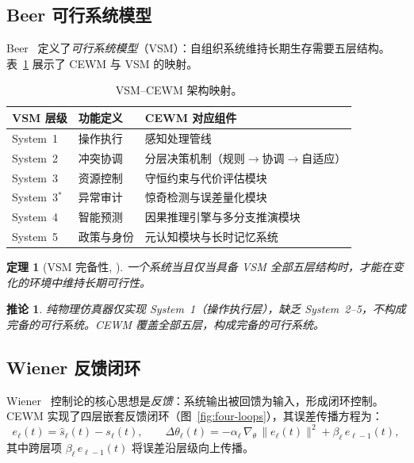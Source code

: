 \documentclass[11pt,a4paper]{article}
\newtheorem{theorem}{定理}[section]
\newtheorem{corollary}{推论}[theorem]
\newcommand{\CEWM}{\textsc{CEWM}}
\newcommand{\VSM}{\textsc{VSM}}
\begin{document}
\subsection{Beer 可行系统模型}

Beer~\citeyearpar{beer1979heart,beer1985diagnosing} 定义了\emph{可行系统模型}（\VSM{}）：自组织系统维持长期生存需要五层结构。表~\ref{tab:vsm} 展示了 \CEWM{} 与 \VSM{} 的映射。

\begin{table}[H]
\centering
\caption{\VSM{}--\CEWM{} 架构映射。}\label{tab:vsm}
\small
\begin{tabularx}{\textwidth}{llX}
\toprule
\textbf{VSM 层级} & \textbf{功能定义} & \textbf{\CEWM{} 对应组件} \\
\midrule
System~1 & 操作执行 & 感知处理管线 \\
System~2 & 冲突协调 & 分层决策机制（规则$\to$协调$\to$自适应） \\
System~3 & 资源控制 & 守恒约束与代价评估模块 \\
System~3$^*$ & 异常审计 & 惊奇检测与误差量化模块 \\
System~4 & 智能预测 & 因果推理引擎与多分支推演模块 \\
System~5 & 政策与身份 & 元认知模块与长时记忆系统 \\
\bottomrule
\end{tabularx}
\end{table}

\begin{theorem}[\VSM{} 完备性, \citeyear{beer1979heart}]\label{thm:vsm}
一个系统当且仅当具备 \VSM{} 全部五层结构时，才能在变化的环境中维持长期可行性。
\end{theorem}

\begin{corollary}\label{cor:vsm-sim}
纯物理仿真器仅实现 System~1（操作执行层），缺乏 System~2--5，不构成完备的可行系统。\CEWM{} 覆盖全部五层，构成完备的可行系统。
\end{corollary}

\subsection{Wiener 反馈闭环}

Wiener~\citeyearpar{wiener1948cybernetics} 控制论的核心思想是\emph{反馈}：系统输出被回馈为输入，形成闭环控制。\CEWM{} 实现了四层嵌套反馈闭环（图~\ref{fig:four-loops}），其误差传播方程为：
\begin{equation}\label{eq:feedback}
  e_{\ell}(t) = \hat{s}_{\ell}(t) - s_{\ell}(t), \qquad \Delta \theta_{\ell}(t) = -\alpha_{\ell} \, \nabla_{\theta} \, \|e_{\ell}(t)\|^2 + \beta_{\ell} \, e_{\ell-1}(t),
\end{equation}
其中跨层项 $\beta_{\ell} \, e_{\ell-1}(t)$ 将误差沿层级向上传播。
\end{document}
